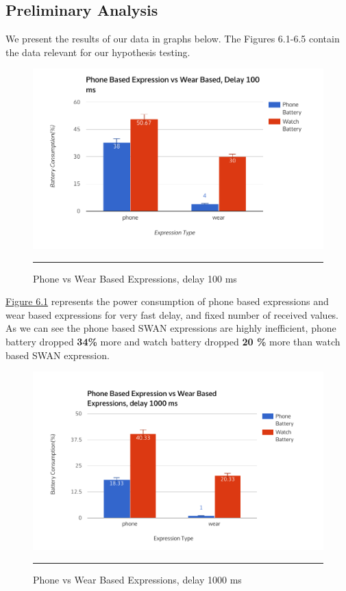 \subsection{Preliminary Analysis}

We present the results of our data in graphs below.
The Figures 6.1-6.5 contain the data relevant for our hypothesis testing.
 
 \begin{figure}[htbp]
  \centering
    \includegraphics[scale=0.8]{Figures/phone_vs_wear_100.pdf}
    \rule{35em}{0.5pt}
  \caption[Phone vs Wear Based Expressions, delay 100 ms]{Phone vs Wear Based Expressions, delay 100 ms}
  \label{fig:phone_vs_wear_100}
\end{figure}

\hyperref[fig:phone_vs_wear_100]{Figure 6.1} represents the power consumption of phone based expressions and wear based expressions for very fast delay,
and fixed number of received values. As we can see the phone based SWAN expressions are highly inefficient, phone battery dropped \textbf{34\%} more and watch battery dropped 
\textbf{20 \% } more than watch based SWAN expression. 

 \begin{figure}[htbp]
  \centering
    \includegraphics[scale=0.8]{Figures/phone_vs_wear_1000.pdf}
    \rule{35em}{0.5pt}
  \caption[Phone vs Wear Based  Expressions, delay 1000 ms]{Phone vs Wear Based  Expressions, delay 1000 ms}
  \label{fig:phone_vs_wear_1000}
\end{figure}

